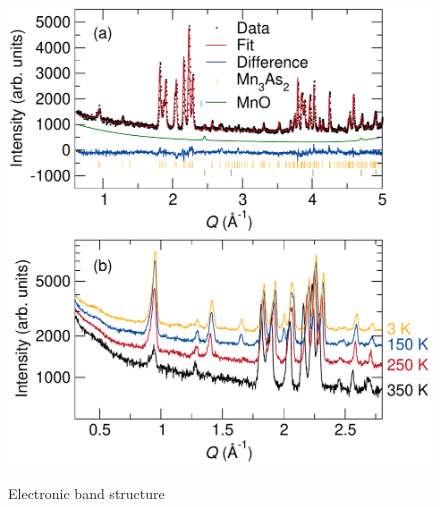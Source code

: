 \documentclass[11pt,edeposit,draftthesis]{uiucthesis2020}
\begin{document}
\begin{mainmatter}
\begin{figure}
\centering\includegraphics[width=\columnwidth]{figures/ch6/350K_rietveld_diff_temp_NPD_cropped.pdf} \\
\caption{\label{fig:350K}
Electronic band structure
}
\end{figure}


\end{mainmatter}
\end{document}
